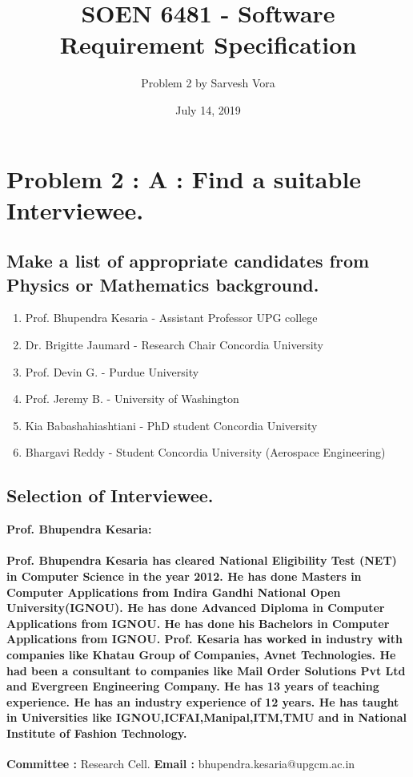 \documentclass{article}
\title{SOEN 6481 - Software Requirement Specification}
\author{Problem 2 by Sarvesh Vora}
\date{July 14, 2019}
\begin{document}
\maketitle
{}
\newpage
\tableofcontents
\newpage
{}

\section{Problem 2 : A : Find a suitable Interviewee.}
\subsection{Make a list of appropriate candidates from Physics or Mathematics background.}
\begin{enumerate}
    \item Prof. Bhupendra Kesaria - Assistant Professor UPG college
    \item Dr. Brigitte Jaumard - Research Chair Concordia University
    \item Prof. Devin G. - Purdue University
    \item Prof. Jeremy B. -  University of Washington
    \item Kia Babashahiashtiani - PhD student Concordia University
    \item Bhargavi Reddy - Student Concordia University (Aerospace Engineering)
\end{enumerate}
\subsection{Selection of Interviewee.}
\hfill \break
\textbf{Prof. Bhupendra Kesaria: }
\paragraph{Prof. Bhupendra Kesaria has cleared National Eligibility Test (NET) in Computer Science in the year 2012. He has done Masters in Computer Applications from Indira Gandhi National Open University(IGNOU). He has done Advanced Diploma in Computer Applications from IGNOU. He has done his Bachelors in Computer Applications from IGNOU. Prof. Kesaria has worked in industry with companies like Khatau Group of Companies, Avnet Technologies. He had been a consultant to companies like Mail Order Solutions Pvt Ltd and Evergreen Engineering Company. He has 13 years of teaching experience. He has an industry experience of 12 years. He has taught in Universities like IGNOU,ICFAI,Manipal,ITM,TMU and in National Institute of Fashion Technology.}
\hfill \break
\hfill \break
\textbf{Committee :}  Research Cell.
\hfill \break
\hfill \break
\textbf{Email :}  bhupendra.kesaria@upgcm.ac.in
\newpage
\end{document}
